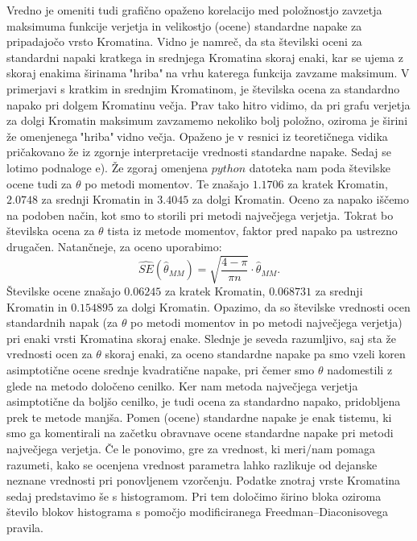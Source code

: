 \documentclass{article}
\begin{document}
Vredno je omeniti tudi grafično opaženo korelacijo med položnostjo zavzetja maksimuma funkcije verjetja in velikostjo (ocene) standardne napake za pripadajočo vrsto Kromatina.
Vidno je namreč, da sta številski oceni za standardni napaki kratkega in srednjega Kromatina skoraj enaki, kar se ujema z skoraj enakima širinama$~$"hriba"$~$na vrhu katerega funkcija zavzame maksimum. 
V primerjavi s kratkim in srednjim Kromatinom, je številska ocena za standardno napako pri dolgem Kromatinu večja. 
Prav tako hitro vidimo, da pri grafu verjetja za dolgi Kromatin maksimum zavzamemo nekoliko bolj položno, oziroma je širini že omenjenega$~$"hriba"$~$vidno večja.
Opaženo je v resnici iz teoretičnega vidika pričakovano že iz zgornje interpretacije vrednosti standardne napake. 
\newline
\newline
Sedaj se lotimo podnaloge e). Že zgoraj omenjena $python$ datoteka nam poda številske ocene tudi za $\theta$ po metodi momentov. 
Te znašajo $1.1706$ za kratek Kromatin, $2.0748$ za srednji Kromatin in $3.4045$ za dolgi Kromatin.
Oceno za napako iščemo na podoben način, kot smo to storili pri metodi največjega verjetja. Tokrat bo številska ocena za $\theta$ tista iz metode momentov, faktor pred napako pa ustrezno drugačen. Natančneje, za oceno uporabimo:
$$
    \widehat{SE}(\hat{\theta}_{MM}) = \sqrt{\frac{4 - \pi}{\pi n}} \cdot\hat{\theta}_{MM}.
$$
Številske ocene znašajo $0.06245$ za kratek Kromatin, $0.068731$ za srednji Kromatin in $0.154895$ za dolgi Kromatin.
\newline
Opazimo, da so številske vrednosti ocen standardnih napak (za $\theta$ po metodi momentov in po metodi največjega verjetja) pri enaki vrsti Kromatina skoraj enake. 
Slednje je seveda razumljivo, saj sta že vrednosti ocen za $\theta$ skoraj enaki, za oceno standardne napake pa smo vzeli koren asimptotične ocene srednje kvadratične napake, pri čemer smo $\theta$ nadomestili z glede na metodo določeno cenilko. 
Ker nam metoda največjega verjetja asimptotične da boljšo cenilko, je tudi ocena za standardno napako, pridobljena prek te metode manjša. 
Pomen (ocene) standardne napake je enak tistemu, ki smo ga komentirali na začetku obravnave ocene standardne napake pri metodi največjega verjetja.
Če le ponovimo, gre za vrednost, ki meri/nam pomaga razumeti, kako se ocenjena vrednost parametra lahko razlikuje od dejanske neznane vrednosti pri ponovljenem vzorčenju.
\newline
\newline
Podatke znotraj vrste Kromatina sedaj predstavimo še s histogramom. Pri tem določimo širino bloka oziroma število blokov histograma s pomočjo modificiranega Freedman–Diaconisovega pravila. 
\end{document}

